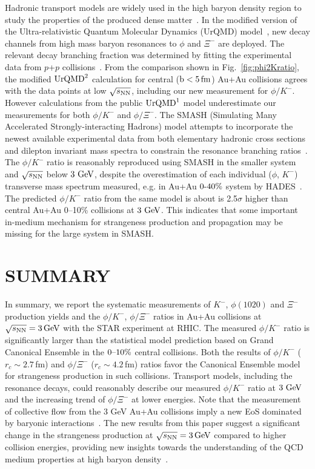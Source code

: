 \documentclass[aps,tightenlines,superscriptaddress,twocolumn]{revtex4-1}
\begin{document}
Hadronic transport models are widely used in the high baryon density region to study the properties of the produced dense matter~\cite{urQMD,UrQMD_2,Steinheimer_2015_UrQMD,Elfner_SMASH,Hartnack:2011cn,Song:2020clw}. In the modified version of the Ultra-relativistic Quantum Molecular Dynamics (UrQMD) model~\cite{Steinheimer_2015_UrQMD}, new decay channels from high mass baryon resonances to $\phi$ and $\Xi^-$ are deployed. The relevant decay branching fraction was determined by fitting the experimental data from $p$+$p$ collisions~\cite{ANKE_phi}. From the comparison shown in Fig.~\ref{fig:phi2Kratio}, the modified $\textup{UrQMD}^{2}$ calculation for central ($\rm{b}<5\,\rm{fm}$) Au+Au collisions agrees with the data points at low ${\sqrt{s_{\rm NN}}}$, including our new measurement for $\phi/K^-$.
However calculations from the public $\textup{UrQMD}^{1}$ model underestimate our measurements for both $\phi/K^-$ and $\phi/\Xi^-$.   
The SMASH (Simulating Many Accelerated Strongly-interacting Hadrons) model attempts to incorporate the newest available experimental data from both elementary hadronic cross sections and dilepton invariant mass spectra to constrain the resonance branching ratios~\cite{Elfner_SMASH}. The $\phi/K^-$ ratio is reasonably reproduced using SMASH in the smaller system and ${\sqrt{s_{\rm NN}}}$ below $\textup{3 GeV}$, despite the overestimation of each individual ($\phi$, $K^-$) transverse mass spectrum measured, e.g. in Au+Au $\textup{0-40\%}$ system by HADES~\cite{Elfner_SMASH,HADES_phi_AuAu}. The predicted $\phi/K^-$ ratio from the same model is about is 2.5$\sigma$ higher than central Au+Au 0--10\% collisions at $\textup{3 GeV}$. This indicates that some important in-medium mechanism for strangeness production and propagation may be missing for the large system in SMASH.

\section{SUMMARY}
\label{summary}

In summary, we report the systematic measurements of $K^-$, $\phi(1020)$ and $\Xi^{-}$ production yields and the $\phi/K^-$, $\phi/\Xi^-$ ratios in Au+Au collisions at ${\sqrt{s_{\rm NN}} = \rm{3\,GeV}}$ with the STAR experiment at RHIC. The measured $\phi/K^-$ ratio is significantly larger than the statistical model prediction based on Grand Canonical Ensemble in the $\textup{0--10\%}$ central collisions. Both the results of $\phi/K^-$ ($r_c \sim 2.7$\,fm) and $\phi/\Xi^-$ ($r_c \sim 4.2$\,fm) ratios favor the Canonical Ensemble model for strangeness production in such collisions. Transport models, including the resonance decays, could reasonably describe our measured $\phi/K^-$ ratio at $\textup{3 GeV}$ and the increasing trend of $\phi/\Xi^-$ at lower energies. 
Note that the measurement of collective flow from the 3 GeV Au+Au collisions imply a new EoS dominated by baryonic interactions~\cite{STAR:2021yiu}. The new results from this paper suggest a significant change in the strangeness production at ${\sqrt{s_{\rm NN}} = \rm{3\,GeV}}$ compared to higher collision energies, providing new insights towards the understanding of the QCD medium properties at high baryon density~\cite{KO_sQM17}. 
\end{document}
